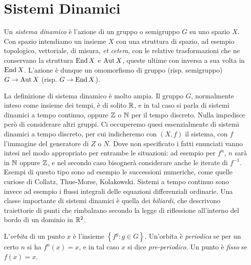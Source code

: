 \section{Sistemi Dinamici}

\begin{defi}
 Un \emph{sistema dinamico} è l'azione di un gruppo o semigruppo $G$ su uno spazio $X$. 
 Con spazio intendiamo un insieme $X$ con una struttura di spazio, ad esempio topologico, vettoriale, di misura, 
 \emph{et cetera}, con le relative trasformazioni che ne conservano la struttura $\operatorname{End} X$ e $\operatorname{Aut} X$, 
 queste ultime con inversa a sua volta in $\operatorname{End} X$. L'azione è dunque un omomorfismo di gruppo (risp. semigruppo) $G\rightarrow \operatorname{Aut} X$ (risp. $G\rightarrow \operatorname{End} X$).
\end{defi}

La definizione di sistema dinamico è molto ampia. 
Il gruppo $G$, normalmente inteso come insieme dei tempi, è di solito $\mathbb{R}$, e in tal caso si parla di sistemi dinamici a tempo continuo, 
oppure $\mathbb{Z}$ o $\mathbb{N}$ per il tempo discreto. Nulla impedisce però di considerare altri gruppi. Ci occuperemo quesi essenzialmente di sistemi dinamici a tempo discreto, 
per cui indicheremo con $(X,f)$ il sistema, con $f$ l'immagine del generatore di $Z$ o $N$. 
Dove non specificato i fatti enunciati vanno intesi nel modo appropriato per entrambe le situazioni: 
ad esempio per $f^n$, $n$ sarà in $\mathbb{N}$ oppure $\mathbb{Z}$, e nel secondo caso bisognerà considerare anche le iterate di $f^{-1}$. 
Esempi di questo tipo sono ad esempio le successioni numeriche, come quelle curiose di Collatz, Thue-Morse, Kolakowski. 
Sistemi a tempo continuo sono invece ad esempio i flussi integrali delle equazioni differenziali ordinarie. 
Una classe importante di sistemi dinamici è quella dei \emph{biliardi}, che descrivono traiettorie di punti che rimbalzano 
secondo la legge di riflessione all'interno del bordo di un dominio in $\mathbb{R}^2$.

\begin{defi} L'\emph{orbita} di un punto $x$ è l'insieme $\left\{f^g: g\in G \right\}$. 
Un'orbita è \emph{periodica} se per un certo $n$ si ha $f^n(x)=x$, e in tal caso $x$ si dice \emph{pre-periodico}. 
Un punto è \emph{fisso} se $f(x)=x$.\end{defi}

